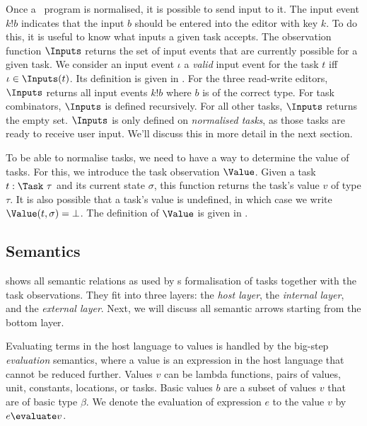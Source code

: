 Once a \TOPHAT\ program is normalised, it is possible to send input to it.
The input event $k!b$ indicates that the input $b$ should be entered into the editor with key $k$.
To do this, it is useful to know what inputs a given task accepts.
The observation function $\Inputs$ returns the set of input events that are currently possible for a given task.
We consider an input event $\iota$ a \emph{valid} input event for the task $t$ iff $\iota \in \Inputs(t)$.
Its definition is given in .
For the three read-write editors, $\Inputs$ returns all input events $k!b$ where $b$ is of the correct type.
For task combinators, $\Inputs$ is defined recursively.
For all other tasks, $\Inputs$ returns the empty set.
$\Inputs$ is only defined on \emph{normalised tasks},
as those tasks are ready to receive user input.
We'll discuss this in more detail in the next section.


To be able to normalise tasks, we need to have a way to determine the value of tasks.
For this, we introduce the task observation $\Value$.
Given a task $t : \Task\ \tau$ and its current state $\sigma$, this function returns the task's value $v$ of type $\tau$.
It is also possible that a task's value is undefined, in which case we write $\Value(t,\sigma) = \bot$.
The definition of $\Value$ is given in .

  {
    {}}


\subsection{Semantics}

 shows all semantic relations as used by \TOPHAT s formalisation of tasks
together with the task observations.
They fit into three layers: the \emph{host layer}, the \emph{internal layer}, and the \emph{external layer}.
Next, we will discuss all semantic arrows starting from the bottom layer.



Evaluating terms in the host language to values is handled by the big-step \emph{evaluation} semantics,
where a value is an expression in the host language that cannot be reduced further.
Values $v$ can be lambda functions, pairs of values, unit, constants, locations, or tasks.
Basic values $b$ are a subset of values $v$ that are of basic type $\beta$.
We denote the evaluation of expression $e$ to the value $v$ by $e \evaluate v$.

